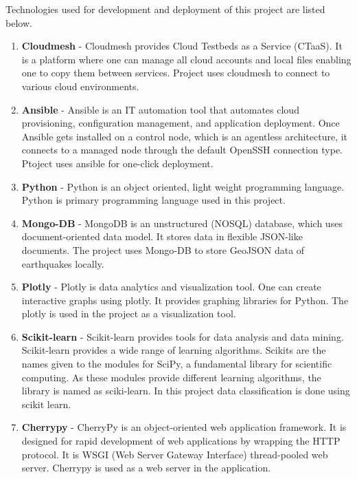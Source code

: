 \documentclass[9pt,twocolumn,twoside]{../../styles/osajnl}
\begin{document}
Technologies used for development and deployment of this project are listed below.
\begin{enumerate}

\item {\bf Cloudmesh} - Cloudmesh provides Cloud Testbeds as a Service (CTaaS). It is a platform where one can manage all cloud accounts and local files enabling one to copy them between services. Project uses cloudmesh to connect to various cloud environments.

\item {\bf Ansible} - Ansible is an IT automation tool that automates cloud provisioning, configuration management, and application deployment. Once Ansible gets installed on a control node, which is an agentless architecture, it connects to a managed node through the default OpenSSH connection type. Ptoject uses ansible for one-click deployment.

\item {\bf Python} - Python is an object oriented, light weight programming language. Python is primary programming language used in this project.

\item {\bf Mongo-DB} - MongoDB is an unstructured (NOSQL) database, which uses document-oriented data model. It stores data in flexible JSON-like documents. The project uses Mongo-DB to store GeoJSON data of earthquakes locally.

\item {\bf Plotly} - Plotly is data analytics and visualization tool. One can create interactive graphs using plotly. It provides graphing libraries for Python. The plotly is used in the project as a visualization tool.

\item {\bf Scikit-learn} - Scikit-learn provides tools for data analysis and data mining. Scikit-learn provides a wide range of learning algorithms. Scikits are the names given to the modules for SciPy, a fundamental library for scientific computing. As these modules provide different learning algorithms, the library is named as sciki-learn. In this project data classification is done using scikit learn.

\item {\bf Cherrypy} - CherryPy is an object-oriented web application framework. It is designed for rapid development of web applications by wrapping the HTTP protocol. It is WSGI (Web Server Gateway Interface) thread-pooled web server. Cherrypy is used as a web server in the application.
\end{enumerate}
\end{document}
